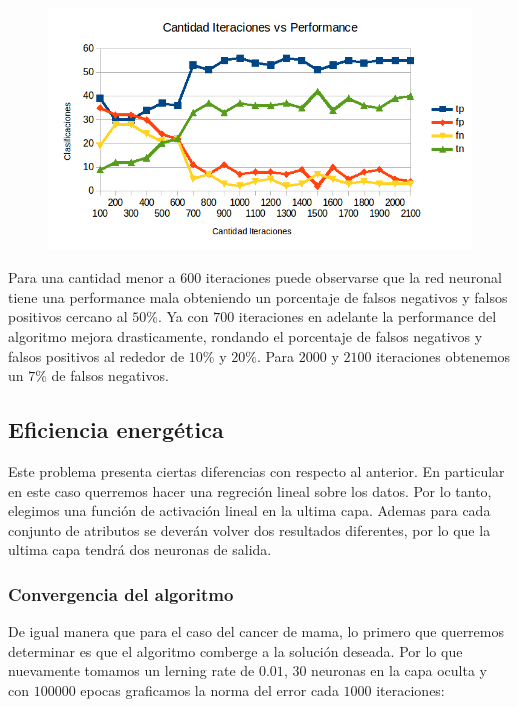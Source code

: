 \begin{figure}[h!]
  \centering
    \includegraphics[scale=0.4]{ej1_test_iter/1.png}
\end{figure}

Para una cantidad menor a $600$ iteraciones puede observarse que la red neuronal tiene una performance mala obteniendo un porcentaje de falsos negativos y falsos positivos cercano al $50\%$. Ya con $700$ iteraciones en adelante la performance del algoritmo mejora drasticamente, rondando el porcentaje de falsos negativos y falsos positivos al rededor de $10 \%$ y $20\%$. Para $2000$ y $2100$ iteraciones obtenemos un $7\%$  de falsos negativos.


\subsection{Eficiencia energética} 


Este problema presenta ciertas diferencias con respecto al anterior. En particular en este caso querremos hacer una regreción lineal sobre los datos. Por lo tanto, elegimos una función de activación lineal en la ultima capa. Ademas para cada conjunto de atributos se deverán volver dos resultados diferentes, por lo que la ultima capa tendrá dos neuronas de salida.

\subsubsection{Convergencia del algoritmo}

De igual manera que para el caso del cancer de mama, lo primero que querremos determinar es que el algoritmo comberge a la solución deseada. Por lo que nuevamente tomamos un lerning rate de $0.01$, $30$ neuronas en la capa oculta y con $100000$ epocas graficamos la norma del error cada $1000$ iteraciones:


